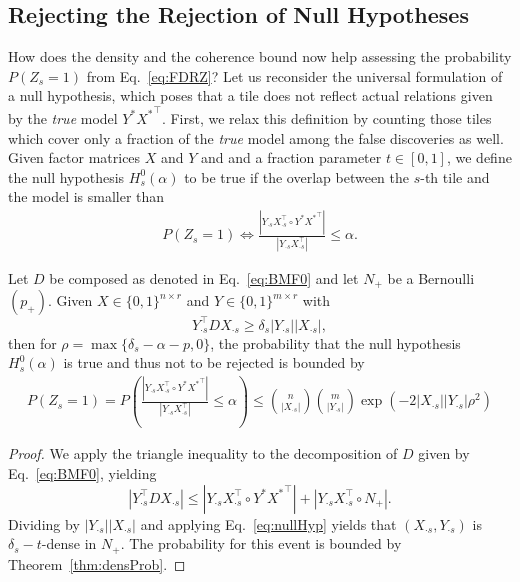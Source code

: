 \subsection{Rejecting the Rejection of Null Hypotheses}\label{sec:TP:rejectNullHyp}
How does the density and the coherence bound now help assessing the  probability $P(Z_s=1)$ from Eq.~\eqref{eq:FDRZ}? Let us reconsider the universal formulation of a null hypothesis, which poses that a tile does not reflect actual relations given by the \emph{true} model $Y^*{X^*}^\top$. First, we relax this definition by counting those tiles which cover only a fraction of the \emph{true} model among the false discoveries as well. Given factor matrices $X$ and $Y$ and and a fraction parameter $t\in[0,1]$, we define the null hypothesis $H_s^0(\alpha)$ to be true if the overlap between the $s$-th tile and the model is smaller than 
\begin{align}\label{eq:nullHyp}
P(Z_s=1)\Leftrightarrow \frac{|Y_{\cdot s}X_{\cdot s}^\top\circ Y^*{X^*}^\top|}{|Y_{\cdot s}X_{\cdot s}^\top|}\leq \alpha.
\end{align}
\begin{corollary}\label{thm:densZ}
Let $D$ be composed as denoted in Eq.~\eqref{eq:BMF0} and let $N_+$ be a Bernoulli $(p_+)$. Given $X\in\{0,1\}^{n\times r}$ and $Y\in\{0,1\}^{m\times r}$ with 
\[Y_{\cdot s}^\top DX_{\cdot s}\geq \delta_s|Y_{\cdot s}||X_{\cdot s}|,\] 
then for $\rho = \max\{\delta_s-\alpha-p,0\}$, the probability that  the null hypothesis $H_s^0(\alpha)$ is true and thus not to be rejected is bounded by
\begin{align*}
P(Z_s=1)= P\left(\frac{|Y_{\cdot s}X_{\cdot s}^\top\circ Y^*{X^*}^\top|}{|Y_{\cdot s}X_{\cdot s}^\top|}\leq \alpha\right)\leq \binom{n}{|X_{\cdot s}|}\binom{m}{|Y_{\cdot s}|}\exp(-2|X_{\cdot s}||Y_{\cdot s}|\rho^2)
\end{align*}
\end{corollary}
\begin{proof}
We apply the triangle inequality to the decomposition of $D$ given by Eq.~\eqref{eq:BMF0}, yielding
\[|Y_{\cdot s}^\top DX_{\cdot s}|\leq |Y_{\cdot s}X_{\cdot s}^\top\circ Y^*{X^*}^\top|+|Y_{\cdot s}X_{\cdot s}^\top \circ N_+|.\]
Dividing by $|Y_{\cdot s}||X_{\cdot s}|$ and applying Eq.~\eqref{eq:nullHyp} yields that $(X_{\cdot s},Y_{\cdot s})$ is $\delta_s-t$-dense in $N_+$.
The probability for this event is bounded by Theorem~\ref{thm:densProb}.
\end{proof}
